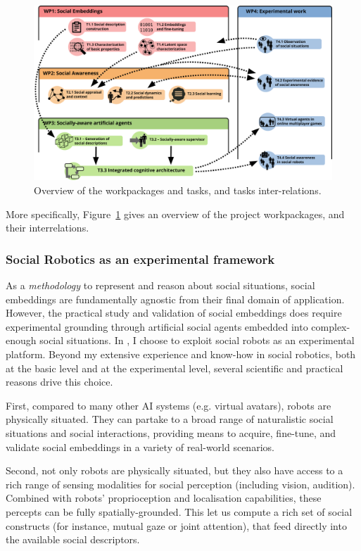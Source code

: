 \begin{figure}[h!]
\centering
\includegraphics[height=0.6\linewidth]{figs/wps}
\caption{Overview of the workpackages and tasks, and tasks inter-relations.}
\label{fig:wps}
\end{figure}

More specifically, Figure~\ref{fig:wps} gives an overview of the project
workpackages, and their interrelations.


\subsubsection{Social Robotics as an experimental framework}

As a \emph{methodology} to represent and reason about social situations, social
embeddings are fundamentally agnostic from their final domain of application.
However, the practical study and validation of social embeddings does require
experimental grounding through artificial social agents embedded into
complex-enough social situations. In \project, I choose to exploit social robots
as an experimental platform.  Beyond my extensive experience and know-how in
social robotics, both at the basic level and at the experimental level, several
scientific and practical reasons drive this choice.

First, compared to many other AI systems (e.g. virtual avatars), robots
are physically situated.  They can partake to a broad range of naturalistic
social situations and social interactions, providing means to acquire,
fine-tune, and validate social embeddings in a variety of real-world scenarios.

Second, not only robots are physically situated, but they also have access to a rich
range of sensing modalities for social perception (including vision, audition).
Combined with robots' proprioception and localisation capabilities, these
percepts can be fully spatially-grounded. This let us compute a rich set of
social constructs (for instance, mutual gaze or joint attention), that feed
directly into the available social descriptors.

